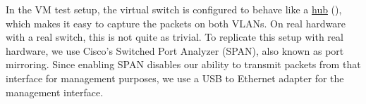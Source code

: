 In the VM test setup, the virtual switch is configured to behave like a \href{https://en.wikipedia.org/wiki/Ethernet_hub}{hub} (\href{https://github.com/NixOS/nixpkgs/blob/0634959ae9c75ac8cab28dfcc9a0f045cf30dfc6/nixos/lib/test-driver/test_driver/vlan.py#L43}{}), which makes it easy to capture the packets on both VLANs. On real hardware with a real switch, this is not quite as trivial. To replicate this setup with real hardware, we use Cisco's Switched Port Analyzer (SPAN), also known as port mirroring. Since enabling SPAN disables our ability to transmit packets from that interface for management purposes, we use a USB to Ethernet adapter for the management interface.
